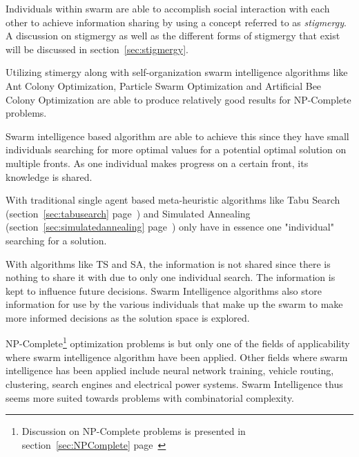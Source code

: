 Individuals within swarm are able to accomplish social interaction with each other to achieve information sharing by using a concept referred to as \emph{stigmergy}\cite{SwarmArt,CompuIntelligenceIntro,FundamentalSwarm}. A discussion on stigmergy as well as the different forms of stigmergy that exist will be discussed in section~\ref{sec:stigmergy}.

Utilizing stimergy along with self-organization swarm intelligence algorithms like Ant Colony Optimization, Particle Swarm Optimization and Artificial Bee Colony Optimization are able to produce relatively good results for NP-Complete problems\cite{CompuIntelligenceIntro,FundamentalSwarm,SwarmArt}. 

Swarm intelligence based algorithm are able to achieve this since they have small individuals searching for more optimal values for a potential optimal solution on multiple fronts. As one individual makes progress on a certain front, its knowledge is shared\cite{CompuIntelligenceIntro,FundamentalSwarm}. 

With traditional single agent based meta-heuristic algorithms like Tabu Search (section~\ref{sec:tabusearch} page~\pageref{sec:tabusearch}) and Simulated Annealing (section~\ref{sec:simulatedannealing} page~\pageref{sec:simulatedannealing}) only have in essence one "individual" searching for a solution\cite{CompuIntelligenceIntro,FundamentalSwarm}. 

With algorithms like TS and SA, the information is not shared since there is nothing to share it with due to only one individual search\cite{CompuIntelligenceIntro,FundamentalSwarm,SASingleMultiObj,TSHazardous}. The information is kept to influence future decisions\cite{AIModernApproach,TabuMontemanniSmith,TabuVechicleRoutingWithTimeWindows,CurveFittingSA,EcoEquilSA}. Swarm Intelligence algorithms also store information for use by the various individuals that make up the swarm to make more informed decisions as the solution space is explored\cite{CompuIntelligenceIntro,FundamentalSwarm}.

NP-Complete\footnote{Discussion on NP-Complete problems is presented in section~\ref{sec:NPComplete} page~\pageref{sec:NPComplete}} optimization problems is but only one of the fields of applicability where swarm intelligence algorithm have been applied. Other fields where swarm intelligence has been applied include neural network training\cite{CompuIntelligenceIntro}, vehicle routing\cite{ACOSurvey}, clustering\cite{AntSwarmClustering}, search engines and electrical power systems\cite{SAElectricPower}. Swarm Intelligence thus seems more suited towards problems with combinatorial complexity\cite{SIOPDenby}.

